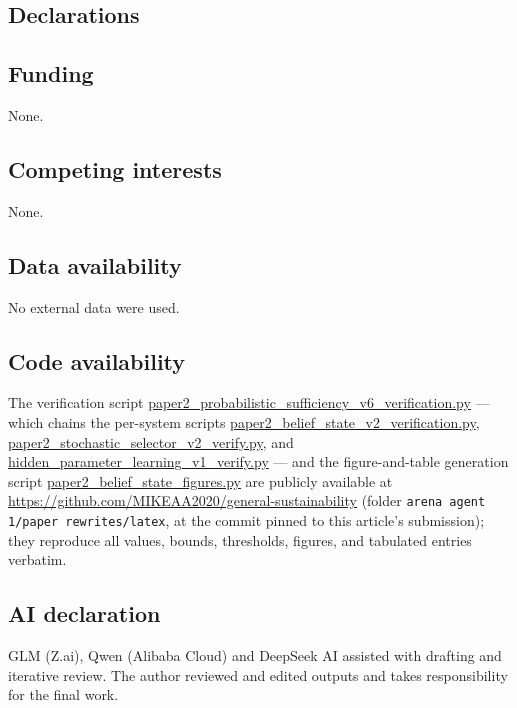 \documentclass[10pt,twocolumn]{article}
\theoremstyle{plain}
\theoremstyle{definition}
\theoremstyle{remark}
\begin{document}
\subsection*{Declarations}

\subsection*{Funding}
None.

\subsection*{Competing interests}
None.

\subsection*{Data availability}
No external data were used.

\subsection*{Code availability}
The verification script
\url{paper2_probabilistic_sufficiency_v6_verification.py} --- which chains
the per-system scripts \url{paper2_belief_state_v2_verification.py},
\url{paper2_stochastic_selector_v2_verify.py}, and
\url{hidden_parameter_learning_v1_verify.py} --- and the figure-and-table
generation script \url{paper2_belief_state_figures.py} are publicly
available at \url{https://github.com/MIKEAA2020/general-sustainability}
(folder \texttt{arena agent 1/paper rewrites/latex}, at the commit
pinned to this article's submission); they reproduce all values, bounds,
thresholds, figures, and tabulated entries verbatim.

\subsection*{AI declaration}
GLM (Z.ai), Qwen (Alibaba Cloud) and DeepSeek AI assisted with drafting
and iterative review. The author reviewed and edited outputs and takes
responsibility for the final work.
\end{document}
